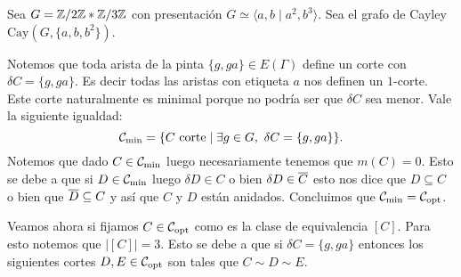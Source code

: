 \documentclass[tesis.tex]{subfiles}
\begin{document}
\begin{ej}
	Sea $G = \mathbb{Z} / 2\mathbb{Z} \ast \mathbb{Z} / 3\mathbb{Z} $ con presentación $G \simeq \langle a,b \mid a^2, b^3 \rangle$.
	Sea el grafo de Cayley  $\text{Cay}(G, \{a,b,b^2\})$.
	
	Notemos que toda arista de la pinta $\{g,ga\} \in E(\Gamma)$ define un corte con $\delta C = \{g,ga\}$.
	Es decir todas las aristas con etiqueta $a$ nos definen un $1$-corte.
	Este corte naturalmente es minimal porque no podría ser que $\delta C$ sea menor. Vale la siguiente igualdad:
	\[
	{\cal C}_{\text{min}} = \{ C \ \text{corte}  \mid \exists g \in G, \ \delta C = \{g,ga\}  \}. 
	\]
	Notemos que dado $C \in {\cal C}_{\text{min}}$ luego necesariamente tenemos que $m(C) = 0$. 
	Esto se debe a que si $D \in {\cal C}_{\text{min}}$ luego $\delta D \in C$ o bien $\delta D \in \overline C$ esto nos dice que $D \subseteq C$ o bien que $\overline D \subseteq C$ y así que $C$ y $D$ están anidados.
	Concluimos que ${\cal C}_{\text{min}} = {\cal C}_{\text{opt}}$.
	
	Veamos ahora si fijamos $C \in {\cal C}_{\text{opt}}$ como es la clase de equivalencia $[C]$.
	Para esto notemos que $|[C]| = 3.$
	Esto se debe a que si $\delta C = \{ g,ga \}$ entonces los siguientes cortes $D,E \in {\cal C}_{\text{opt}}$ son tales que $C \sim D \sim E$.
	
	\begin{figure}[H]
		\centering
\end{figure}
\end{ej}
\end{document}
